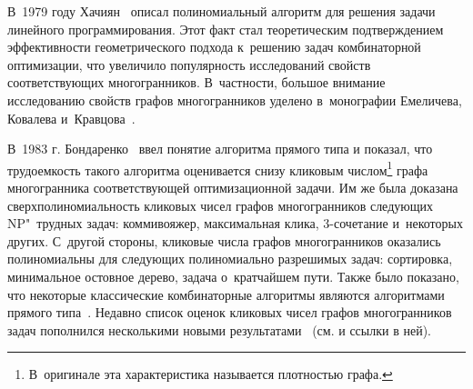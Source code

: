 В~1979 году Хачиян~\cite{Khachiyan:1979} описал полиномиальный алгоритм для решения задачи линейного программирования.
Этот факт стал теоретическим подтверждением эффективности геометрического подхода к~решению задач комбинаторной оптимизации, что увеличило популярность исследований свойств соответствующих многогранников.
В~частности, большое внимание исследованию свойств графов многогранников уделено в~монографии Емеличева, Ковалева и~Кравцова~\cite{Emelichev:1981}.

В~1983 г. Бондаренко~\cite{BondBook:1995} ввел понятие алгоритма прямого типа и показал, что трудоемкость такого алгоритма оценивается снизу кликовым числом\footnote{В~оригинале эта характеристика называется плотностью графа.} графа многогранника соответствующей оптимизационной задачи.
Им же была доказана сверхполиномиальность кликовых чисел графов многогранников следующих NP"~трудных задач: коммивояжер, максимальная клика, 3-сочетание и~некоторых других.
С~другой стороны, кликовые числа графов многогранников оказались полиномиальны для следующих полиномиально разрешимых задач: сортировка, минимальное остовное дерево, задача о~кратчайшем пути.
Также было показано, что некоторые классические комбинаторные алгоритмы являются алгоритмами прямого типа~\cite{BondBook:1995}.
Недавно список оценок кликовых чисел графов многогранников задач пополнился несколькими новыми результатами~%
(см. \cite{Nikolaev:2017} и ссылки в ней).

